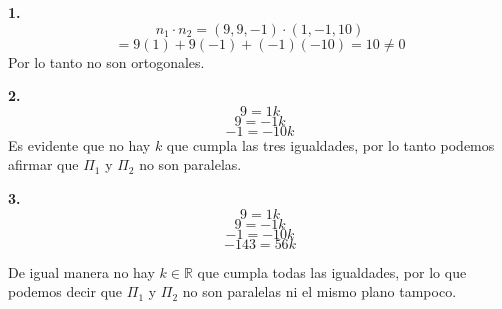\documentclass{article}
\begin{document}
\textbf{1.}
$$n_1 \cdot n_2 = (9,9,-1)\cdot (1,-1,10)$$
$$ =9(1)+9(-1)+(-1)(-10)=10 \neq 0$$
Por lo tanto no son ortogonales.
\vspace*{10pt}


\textbf{2.}
$$9 = 1k$$
$$9 = -1k$$
$$-1 = -10k$$
Es evidente que no hay $k$ que cumpla las tres igualdades, por lo tanto podemos afirmar que $\Pi_1$ y $\Pi_2$ no son paralelas.
\vspace{10pt}


\textbf{3.}
$$9 = 1k$$
$$9 = -1k$$
$$-1 = -10k$$
$$-143= 56k$$


De igual manera no hay $k \in \mathbb{R}$ que cumpla todas las igualdades, por lo que podemos decir que $\Pi_1$ y $\Pi_2$ no son paralelas
ni el mismo plano tampoco.
\end{document}
